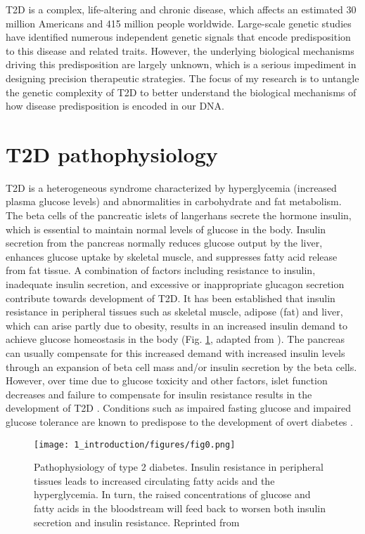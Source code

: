 \ac{T2D} is a complex, life-altering and chronic disease, which affects an estimated 30 million Americans and 415 million people worldwide. Large-scale genetic studies have identified numerous independent genetic signals that encode predisposition to this disease and related traits. However, the underlying biological mechanisms driving this predisposition are largely unknown, which is a serious impediment in designing precision therapeutic strategies. The focus of my research is to untangle the genetic complexity of T2D to better understand the biological mechanisms of how disease predisposition is encoded in our DNA.


\section{T2D pathophysiology}
T2D is a heterogeneous syndrome characterized by hyperglycemia (increased plasma glucose levels) and abnormalities in carbohydrate and fat metabolism. The beta cells of the pancreatic islets of langerhans secrete the hormone insulin, which is essential to maintain normal levels of glucose in the body. Insulin secretion from the pancreas normally reduces glucose output by the liver, enhances glucose uptake by skeletal muscle, and suppresses fatty acid release from fat tissue. A combination of factors including resistance to insulin, inadequate insulin secretion, and excessive or inappropriate glucagon secretion contribute towards development of T2D. It has been established that insulin resistance in peripheral tissues such as skeletal muscle, adipose (fat) and liver, which can arise partly due to obesity, results in an increased insulin demand to achieve glucose homeostasis in the body \cite{stumvollTypeDiabetesPrinciples2005} (Fig. \ref{fig:ci_f0}, adapted from \cite{stumvollTypeDiabetesPrinciples2005}). The pancreas can usually compensate for this increased demand with increased insulin levels through an expansion of beta cell mass and/or insulin secretion by the beta cells. However, over time due to glucose toxicity and other factors, islet function decreases and failure to compensate for insulin resistance results in the development of T2D \cite{kellerGeneExpressionNetwork2008}. Conditions such as impaired fasting glucose and impaired glucose tolerance are known to predispose to the development of overt diabetes \cite{stumvollTypeDiabetesPrinciples2005}.


\begin{figure}
        \centering
        \texttt{[image: 1\_introduction/figures/fig0.png]}
        \caption[Pathophysiology of type 2 diabetes]{Pathophysiology of type 2 diabetes. Insulin resistance in peripheral tissues leads to increased circulating fatty acids and the hyperglycemia. In turn, the raised concentrations of glucose and fatty acids in the bloodstream will feed back to worsen both insulin secretion and insulin resistance. Reprinted from \cite{stumvollTypeDiabetesPrinciples2005}}
        \label{fig:ci_f0}
\end{figure}



